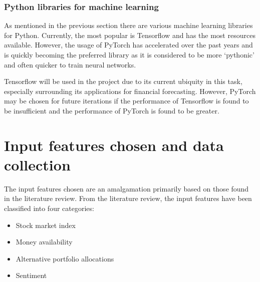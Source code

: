 \subsubsection{Python libraries for machine learning}
As mentioned in the previous section there are various machine learning libraries for Python. Currently, the
most popular is Tensorflow and has the most resources available.
However, the usage of PyTorch has accelerated over the past years and is quickly becoming the preferred
library as it is considered to be more `pythonic' and often quicker to train neural networks.

Tensorflow will be used in the project due to its current ubiquity in this task, especially surrounding
its applications for financial forecasting. However, PyTorch may be chosen for future iterations if
the performance of Tensorflow is found to be insufficient and the performance of PyTorch is found to be
greater.

\section{Input features chosen and data collection}
The input features chosen are an amalgamation primarily based on those found in the literature review.
From the literature review, the input features have been classified into four categories:
\begin{itemize}
    \item Stock market index
    \item Money availability
    \item Alternative portfolio allocations
    \item Sentiment
\end{itemize}

